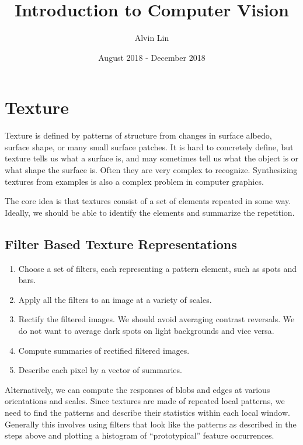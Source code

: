 \documentclass{math}
\title{Introduction to Computer Vision}
\author{Alvin Lin}
\date{August 2018 - December 2018}
\begin{document}
\maketitle

\section*{Texture}
Texture is defined by patterns of structure from changes in surface albedo,
surface shape, or many small surface patches. It is hard to concretely define,
but texture tells us what a surface is, and may sometimes tell us what the
object is or what shape the surface is. Often they are very complex to
recognize. Synthesizing textures from examples is also a complex problem in
computer graphics. \par
The core idea is that textures consist of a set of elements repeated in some
way. Ideally, we should be able to identify the elements and summarize the
repetition.

\subsection*{Filter Based Texture Representations}
\begin{enumerate}
  \item Choose a set of filters, each representing a pattern element, such
    as spots and bars.
  \item Apply all the filters to an image at a variety of scales.
  \item Rectify the filtered images. We should avoid averaging contrast
    reversals. We do not want to average dark spots on light backgrounds
    and vice versa.
  \item Compute summaries of rectified filtered images.
  \item Describe each pixel by a vector of summaries.
\end{enumerate}
Alternatively, we can compute the responses of blobs and edges at various
orientations and scales. Since textures are made of repeated local patterns,
we need to find the patterns and describe their statistics within each local
window. Generally this involves using filters that look like the patterns
as described in the steps above and plotting a histogram of ``prototypical''
feature occurrences.
\end{document}
